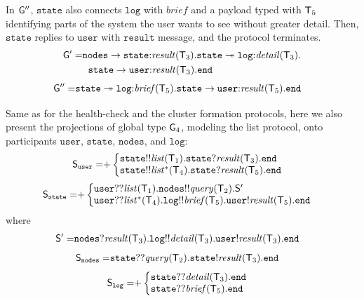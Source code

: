 In ${\sf G}''$, $\mathtt{state}$ also connects $\mathtt{log}$ with $\mathit{brief}$ and a payload typed with ${\mathsf T}_5$ identifying parts of the system the user wants to see without greater detail. Then, $\mathtt{state}$ replies to $\mathtt{user}$ with $\mathtt{result}$ message, and the protocol terminates.
\begin{align*}
\begin{split}
	{\sf G}' =  & 
	\mathtt{nodes}\to\mathtt{state}{:}\mathit{result}({\mathsf T}_3).\mathtt{state}\twoheadrightarrow \mathtt{log}{:}\mathit{detail}({\mathsf T}_3). \\
	& \hspace{2mm}
	\mathtt{state}\to\mathtt{user}{:}\mathit{result}({\mathsf T}_3).\mathtt{end}
\end{split}
\end{align*}
\begin{align*}
	{\sf G}'' = &
	\mathtt{state}\twoheadrightarrow \mathtt{log}{:}\mathit{brief}({\mathsf T}_5).\mathtt{state}\to\mathtt{user}{:}\mathit{result}({\mathsf T}_5).\mathtt{end}
\end{align*}

\noindent
Same as for the health-check and the cluster formation protocols, here we also present the projections of global type ${\sf G}_4$, modeling the list protocol, onto participants $\mathtt{user}$, $\mathtt{state}$, $\mathtt{nodes}$, and $\mathtt{log}$:
\begin{align*}
	\ST_\mathtt{user} =& 
	{+}
	\left\{
	\begin{array}{@{}l@{}}  
	\mathtt{state}{!!}\mathit{list}(\T_1).\mathtt{state}{?}\mathit{result}(\T_3).\tend \\
	\mathtt{state}{!!}\mathit{list^*}(\T_4).\mathtt{state}{?}\mathit{result}(\T_5).\tend 
	\end{array} \right.
\end{align*}
\begin{align*}
	\ST_\mathtt{state} =&
	{+}
	\left\{
	\begin{array}{@{}l@{}}  
	\mathtt{user}{??}\mathit{list}(\T_1).\mathtt{nodes}{!!}\mathit{query}(\T_2).\ST'\\
	\mathtt{user}{??}\mathit{list^*}(\T_4).\mathtt{log}{!!}\mathit{brief}(\T_5).\mathtt{user}{!}\mathit{result}(\T_5).\tend
	\end{array} \right. 
\end{align*}
where
\begin{align*}
	{\mathsf S}'  =& 
	\mathtt{nodes}{?}\mathit{result}({\mathsf T}_3).\mathtt{log}{!!}\mathit{detail}({\mathsf T}_3).\mathtt{user}{!}\mathit{result}({\mathsf T}_3).\mathtt{end}
\end{align*}
\begin{align*}
	{\mathsf S}_\mathtt{nodes} = &
	\mathtt{state}{??}\mathit{query}({\mathsf T}_2).\mathtt{state}{!}\mathit{result}({\mathsf T}_3).\mathtt{end}
\end{align*}
\begin{align*}
	\ST_\mathtt{log} = & 
	{+}
	\left\{
	\begin{array}{@{}l@{}}  
	\mathtt{state}{??}\mathit{detail}(\T_3).\tend \\
	\mathtt{state}{??}\mathit{brief}(\T_5).\tend \\
	\end{array} \right.
\end{align*}

